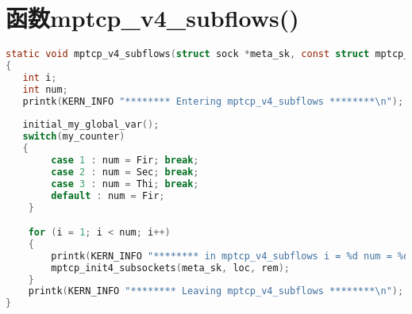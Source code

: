 \documentclass[macfonts,phd,oneside,nobackinfo]{njuthesis}
\begin{document}
\section{函数mptcp\_v4\_subflows()}
\begin{lstlisting}[language=C]
static void mptcp_v4_subflows(struct sock *meta_sk, const struct mptcp_loc4 *loc, struct mptcp_rem4 *rem)
{
   int i;
   int num;
   printk(KERN_INFO "******** Entering mptcp_v4_subflows ********\n");
  
   initial_my_global_var();
   switch(my_counter)
   {   
		case 1 : num = Fir; break;
		case 2 : num = Sec; break;
		case 3 : num = Thi; break;
		default : num = Fir;
	}

	for (i = 1; i < num; i++) 
	{
		printk(KERN_INFO "******** in mptcp_v4_subflows i = %d num = %d********\n",i,num);
		mptcp_init4_subsockets(meta_sk, loc, rem);
	}
	printk(KERN_INFO "******** Leaving mptcp_v4_subflows ********\n");
}
\end{lstlisting} 

\backmatter



\end{document}
